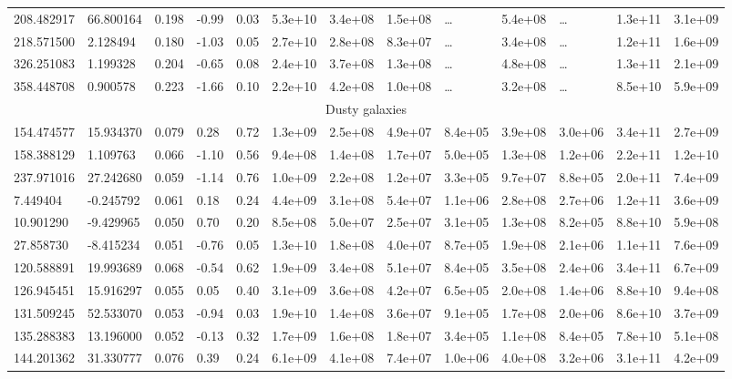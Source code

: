 \documentclass[referee]{aa}
\begin{document}
{\begin{landscape}
\begin{longtable}{lllllllllllll}
208.482917 & 66.800164 & 0.198 & -0.99 & 0.03 & 5.3e+10 & 3.4e+08 & 1.5e+08 & \ldots & 5.4e+08 & \ldots & 1.3e+11 & 3.1e+09 \\
218.571500 & 2.128494 & 0.180 & -1.03 & 0.05 & 2.7e+10 & 2.8e+08 & 8.3e+07  & \ldots & 3.4e+08 & \ldots & 1.2e+11 & 1.6e+09 \\
326.251083 & 1.199328 & 0.204 & -0.65 & 0.08 & 2.4e+10 & 3.7e+08 & 1.3e+08  & \ldots & 4.8e+08 & \ldots & 1.3e+11 & 2.1e+09 \\
358.448708 & 0.900578 & 0.223 & -1.66 & 0.10 & 2.2e+10 & 4.2e+08 & 1.0e+08  & \ldots & 3.2e+08 & \ldots & 8.5e+10 & 5.9e+09 \\
\hline
\multicolumn{13}{c}{Dusty galaxies} \\
\hline
154.474577 & 15.934370 & 0.079 & 0.28 & 0.72 & 1.3e+09 & 2.5e+08 & 4.9e+07 & 8.4e+05 & 3.9e+08 & 3.0e+06 & 3.4e+11 & 2.7e+09 \\
158.388129 & 1.109763 & 0.066 & -1.10 & 0.56 & 9.4e+08 & 1.4e+08 & 1.7e+07 & 5.0e+05 & 1.3e+08 & 1.2e+06 & 2.2e+11 & 1.2e+10 \\
237.971016 & 27.242680 & 0.059 & -1.14 & 0.76 & 1.0e+09 & 2.2e+08 & 1.2e+07 & 3.3e+05 & 9.7e+07 & 8.8e+05 & 2.0e+11 & 7.4e+09 \\
7.449404 & -0.245792 & 0.061 & 0.18 & 0.24 & 4.4e+09 & 3.1e+08 & 5.4e+07 & 1.1e+06 & 2.8e+08 & 2.7e+06 & 1.2e+11 & 3.6e+09 \\
10.901290 & -9.429965 & 0.050 & 0.70 & 0.20 & 8.5e+08 & 5.0e+07 & 2.5e+07 & 3.1e+05 & 1.3e+08 & 8.2e+05 & 8.8e+10 & 5.9e+08 \\
27.858730 & -8.415234 & 0.051 & -0.76 & 0.05 & 1.3e+10 & 1.8e+08 & 4.0e+07 & 8.7e+05 & 1.9e+08 & 2.1e+06 & 1.1e+11 & 7.6e+09 \\
120.588891 & 19.993689 & 0.068 & -0.54 & 0.62 & 1.9e+09 & 3.4e+08 & 5.1e+07 & 8.4e+05 & 3.5e+08 & 2.4e+06 & 3.4e+11 & 6.7e+09 \\
126.945451 & 15.916297 & 0.055 & 0.05 & 0.40 & 3.1e+09 & 3.6e+08 & 4.2e+07 & 6.5e+05 & 2.0e+08 & 1.4e+06 & 8.8e+10 & 9.4e+08 \\
131.509245 & 52.533070 & 0.053 & -0.94 & 0.03 & 1.9e+10 & 1.4e+08 & 3.6e+07 & 9.1e+05 & 1.7e+08 & 2.0e+06 & 8.6e+10 & 3.7e+09 \\
135.288383 & 13.196000 & 0.052 & -0.13 & 0.32 & 1.7e+09 & 1.6e+08 & 1.8e+07 & 3.4e+05 & 1.1e+08 & 8.4e+05 & 7.8e+10 & 5.1e+08 \\
144.201362 & 31.330777 & 0.076 & 0.39 & 0.24 & 6.1e+09 & 4.1e+08 & 7.4e+07 & 1.0e+06 & 4.0e+08 & 3.2e+06 & 3.1e+11 & 4.2e+09 \\

\end{longtable}
\end{landscape}}
\end{document}
